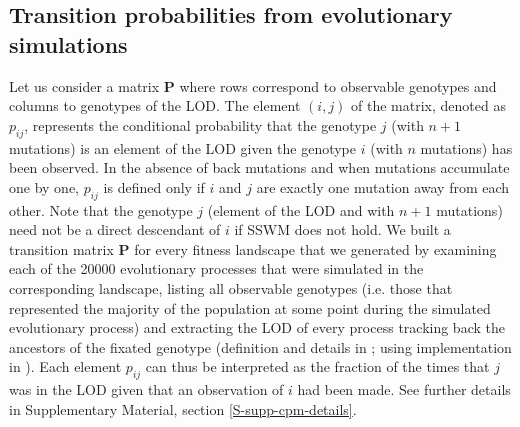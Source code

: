 \documentclass[a4paper,10pt]{article}
\begin{document}
\subsection{Transition probabilities from evolutionary simulations}
\label{sec:methods:sim}

Let us consider a matrix $\mathbf{P}$ where rows correspond to observable
genotypes and columns to genotypes of the LOD. The element $(i,j)$ of the
matrix, denoted as $p_{ij}$, represents the conditional probability that
the genotype $j$ (with $n+1$ mutations) is an element of the LOD given the
genotype $i$ (with $n$ mutations) has been observed. In the absence of
back mutations and when mutations accumulate one by one, $p_{ij}$ is
defined only if $i$ and $j$ are exactly one mutation away from each other.
Note that the genotype $j$ (element of the LOD and with $n+1$ mutations)
need not be a direct descendant of $i$ if SSWM does not hold. We built a
transition matrix $\mathbf{P}$ for every fitness landscape that we
generated by examining each of the 20000 evolutionary processes that were
simulated in the corresponding landscape, listing all observable genotypes
(i.e. those that represented the majority of the population at some point
during the simulated evolutionary process) and extracting the LOD of every
process tracking back the ancestors of the fixated genotype (definition
and details in \cite{szendro_predictability_2013}; using implementation in
\cite{diaz-uriarte2017}).  Each element $p_{ij}$ can thus be interpreted
as the fraction of the times that $j$ was in the LOD given that an
observation of $i$ had been made. See further details in Supplementary
Material, section \ref{S-supp-cpm-details}.



\end{document}
